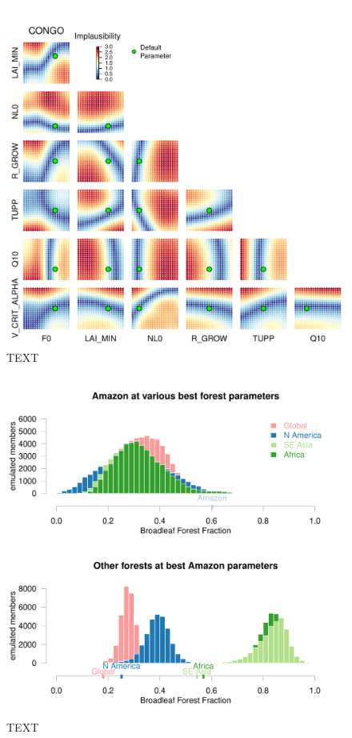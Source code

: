 \documentclass[esd, manuscript]{copernicus}
\begin{document}
\begin{figure}[t]
\includegraphics[width=12cm]{graphics/taat_congo.pdf}
\caption{TEXT}
\label{fig:}
\end{figure}

\begin{figure}[t]
\includegraphics[width=12cm]{graphics/best_inputs_swaps_hists_Paired.pdf}
\caption{TEXT}
\label{fig:best_inputs_swaps_hists_Paired}
\end{figure}
\end{document}
